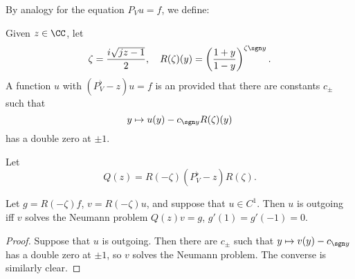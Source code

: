 By analogy for the equation $P_Vu = f$, we define:

\begin{definition}
Given $z \in \CC$, let
$$\zeta = \frac{i\sqrt{jz - 1}}{2}, \quad R(\zeta)(y) = \left(\frac{1 + y}{1 - y}\right)^{\zeta \sgn y}.$$
A function $u$ with $(P_V^\flat - z)u = f$ is an  provided that there are constants $c_\pm$ such that
$$y \mapsto u(y) - c_{\sgn y} R(\zeta)(y)$$
has a double zero at $\pm 1$.
\end{definition}

Let
$$Q(z) = R(-\zeta)(P_V^\flat - z)R(\zeta).$$

\begin{lemma}
Let $g = R(-\zeta)f$, $v = R(-\zeta)u$, and suppose that $u \in C^1$.
Then $u$ is outgoing iff $v$ solves the Neumann problem $Q(z)v = g$, $g'(1) = g'(-1) = 0$.
\end{lemma}
\begin{proof}
Suppose that $u$ is outgoing. Then there are $c_\pm$ such that $y \mapsto v(y) - c_{\sgn y}$ has a double zero at $\pm 1$, so $v$ solves the Neumann problem.
The converse is similarly clear.
\end{proof}

